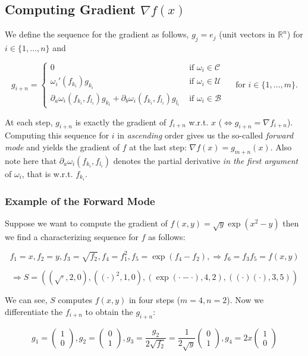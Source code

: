 \documentclass[11pt,a4paper]{article}
\def\R{{\mathbb R}}
\theoremstyle{definition} %
\begin{document}
\subsection{Computing Gradient $\nabla f(x)$}

We define the sequence for the gradient as follows,
$g_j = e_j$ (unit vectors in $\R^n$) for $i \in \{
	1, \ldots, n
	\} $ and

\[
	g_{i+n} = \begin{cases}
		0
		 & \text{ if } \omega_i \in \mathcal{C} \\
		\omega_i ' (f_{k_i}) g_{k_i}
		 & \text{ if } \omega_i \in \mathcal{U} \\
		\partial_a \omega_i (f_{k_i}, f_{l_i}) g_{k_i}
		+ \partial_b \omega_i (f_{k_i}, f_{l_i}) g_{l_i}
		 & \text{ if } \omega_i \in \mathcal{B}
	\end{cases} \quad \text{ for }
	i \in \{
	1, \ldots, m
	\}.
\]

At each step, $g_{i+n}$ is exactly the gradient of $f_{i+n}$
w.r.t. $x$ ($\Leftrightarrow g_{i+n} = \nabla f_{i+n}$).
Computing this sequence for $i$ in \textit{ascending} order gives us
the so-called \textit{forward mode} and yields the gradient of $f$
at the last step: $\nabla f(x) = g_{m+n} (x)$. Also note here that
$\partial_a \omega_i (f_{k_i}, f_{l_i})$ denotes the partial derivative
\textit{in the first argument} of $\omega_i$, that is w.r.t. $f_{k_i}$.

\subsubsection{Example of the Forward Mode}
Suppose we want to compute the gradient of
$f(x, y) = \sqrt{y} \exp(x^2  - y)$
then we find a characterizing sequence for $f$ as follows:

\[
	f_1=x,
	f_2=y,
	f_3=\sqrt{f_2},
	f_4=f_1^2,
	f_5=\exp(f_4 - f_2),
	\Rightarrow f_6=f_3 f_5 = f(x, y)
\]

\[
	\Rightarrow S = \left(
	(\sqrt{\cdot}, 2, 0),
	((\cdot)^2, 1, 0),
	(\exp(\cdot - \cdot), 4, 2),
	((\cdot)(\cdot), 3, 5)
	\right)
\]

We can see, $S$ computes $f(x,y)$ in four steps ($m=4, n=2$).
Now we differentiate the $f_{i+n}$ to obtain the $g_{i+n}$:

\[
	g_1 = \begin{pmatrix} 1 \\ 0 \end{pmatrix},
	g_2 = \begin{pmatrix} 0 \\ 1 \end{pmatrix},
	g_3 =
	\frac{ g_2 }{ 2 \sqrt{f_2} } =
	\frac{ 1 }{ 2 \sqrt{y} } \begin{pmatrix} 0 \\ 1 \end{pmatrix},
	g_4 = 2 x \begin{pmatrix} 1 \\ 0 \end{pmatrix}
\]
\end{document}
